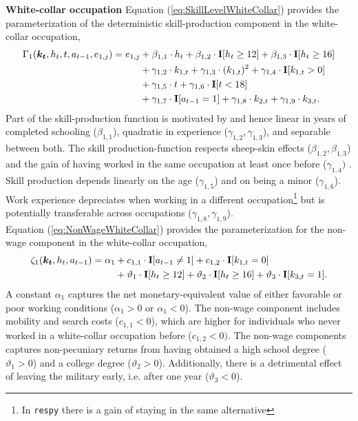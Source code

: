 \noindent\textbf{White-collar occupation} Equation (\ref{eq:SkillLevelWhiteCollar}) provides the parameterization of the deterministic skill-production component in the white-collar occupation,
%
\begin{align}\label{eq:SkillLevelWhiteCollar}
    \Gamma_1(\bm{k_t}, h_t, t, a_{t-1}, e_{1,j}) = e_{1,j} & + \beta_{1,1} \cdot h_t + \beta_{1, 2} \cdot {\textbf{I}}[h_t \geq 12] + \beta_{1,3} \cdot {\textbf{I}}[h_t\geq 16] \nonumber\\
                                 \nonumber & + \gamma_{1, 2} \cdot  k_{1,t} + \gamma_{1,3} \cdot  (k_{1,t})^2 + \gamma_{1,4} \cdot  {\textbf{I}}[k_{1,t} > 0] \\
                                  \nonumber & + \gamma_{1,5} \cdot  t + \gamma_{1,6} \cdot {\textbf{I}}[t < 18] \nonumber\\
                                  & + \gamma_{1,7} \cdot {\textbf{I}}[a_{t-1} = 1] + \gamma_{1,8} \cdot  k_{2,t} + \gamma_{1,9} \cdot  k_{3,t}.
\end{align}
%
\noindent Part of the skill-production function is motivated by \citet{Mincer.1958, Mincer.1974} and hence linear in years of completed schooling ($\beta_{1,1}$), quadratic in experience ($\gamma_{1,2}, \gamma_{1,3}$), and separable between both. The skill production-function respects sheep-skin effects ($\beta_{1,2}, \beta_{1,3}$) and the gain of having worked in the same occupation at least once before ($\gamma_{1,4})$ \citep{Spence.1973, Arrow.1973, Hungerford.1987, Jaeger.1996}. Skill production depends linearly on the age ($\gamma_{1,5}$) and on being a minor ($\gamma_{1,6}$). Work experience depreciates when working in a different occupation\footnote{In \texttt{respy} there is a gain of staying in the same alternative} but is potentially transferable across occupations ($\gamma_{1,8}, \gamma_{1,9}$). \\

\noindent Equation (\ref{eq:NonWageWhiteCollar}) provides the parameterization for the non-wage component in the white-collar occupation,
%
\begin{align}\label{eq:NonWageWhiteCollar}
\zeta_{1}(\bm{k_t}, h_t, a_{t-1}) = \alpha_1  & + c_{1,1} \cdot {\textbf{I}}[a_{t-1} \neq 1] + c_{1,2} \cdot {\textbf{I}}[k_{1,t} = 0] \nonumber \\
                            & + \vartheta_1 \cdot {\textbf{I}}[h_t \geq 12] + \vartheta_2 \cdot {\textbf{I}}[h_t \geq 16] + \vartheta_3 \cdot {\textbf{I}}[k_{3,t} = 1].
\end{align}
%
A constant $\alpha_1$ captures the net monetary-equivalent value of either favorable or poor working conditions ($\alpha_1 > 0$ or $\alpha_1 < 0$). The non-wage component includes mobility and search costs ($c_{1,1} < 0$), which are higher for individuals who never worked in a white-collar occupation before ($c_{1,2}< 0)$. The non-wage components captures non-pecuniary returns from having obtained a high school degree ($\vartheta_1 >0 $) and a college degree ($\vartheta_2 >0$). Additionally, there is a detrimental effect of leaving the military early, i.e. after one year ($\vartheta_3 < 0$).\\

